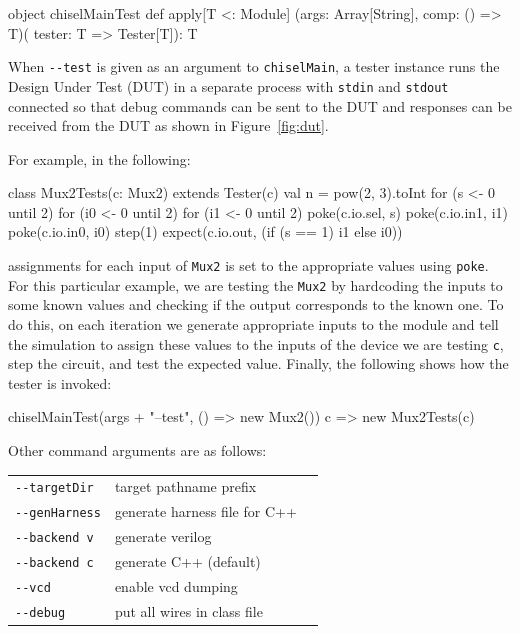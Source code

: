 \documentclass[twocolumn,10pt]{article}
\def\code#1{{\tt #1}}
\begin{document}
\begin{scala}
object chiselMainTest {
  def apply[T <: Module]
    (args: Array[String], comp: () => T)(
     tester: T => Tester[T]): T
}
\end{scala}

\noindent
When \code{-{-}test} is given as an argument to \code{chiselMain}, a
tester instance runs the Design Under Test (DUT) in a separate
process with \code{stdin} and \code{stdout} connected so that debug commands can 
be sent to the DUT and responses can be received from the DUT as shown in
Figure~\ref{fig:dut}.
\noindent

For example, in the following:

\begin{scala}
class Mux2Tests(c: Mux2) extends Tester(c) {
  val n = pow(2, 3).toInt
  for (s <- 0 until 2) {
    for (i0 <- 0 until 2) {
      for (i1 <- 0 until 2) {
        poke(c.io.sel, s)
        poke(c.io.in1, i1)
        poke(c.io.in0, i0)
        step(1)
        expect(c.io.out, (if (s == 1) i1 else i0))
      }
    }
  }
}
\end{scala}

\noindent
assignments for each input of \verb+Mux2+ is set to the appropriate values using \verb+poke+. For this particular example, we are testing the \verb+Mux2+ by hardcoding the inputs to some known values and checking if the output corresponds to the known one. To do this, on each iteration we generate appropriate inputs to the module and tell the simulation to assign these values to the inputs of the device we are testing \verb+c+, step the circuit, and test the expected value.  
Finally, the following shows how the tester is invoked:

\begin{scala}
chiselMainTest(args + "--test", () => new Mux2()){ 
  c => new Mux2Tests(c) 
}
\end{scala}

Other command arguments are as follows:
\begin{tabular}{lll}
\verb+--targetDir+ & target pathname prefix \\
\verb+--genHarness+ & generate harness file for C++ \\
\verb+--backend v+ & generate verilog \\
\verb+--backend c+ & generate C++ (default)\\
\verb+--vcd+ & enable vcd dumping \\
\verb+--debug+ & put all wires in class file \\
\end{tabular}
\end{document}
